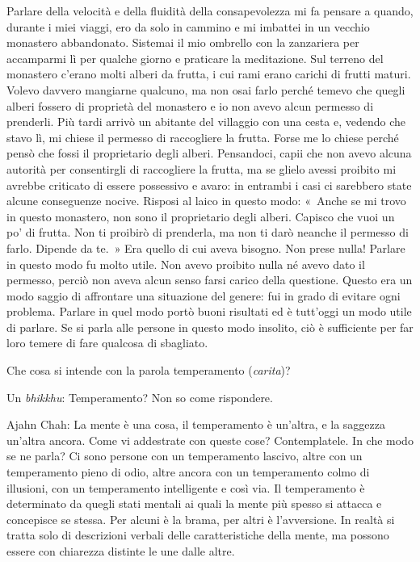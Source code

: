Parlare della velocità e della fluidità della consapevolezza mi fa
pensare a quando, durante i miei viaggi, ero da solo in cammino e mi
imbattei in un vecchio monastero abbandonato. Sistemai il mio ombrello
con la zanzariera per accamparmi lì per qualche giorno e praticare la
meditazione. Sul terreno del monastero c'erano molti alberi da frutta, i
cui rami erano carichi di frutti maturi. Volevo davvero mangiarne
qualcuno, ma non osai farlo perché temevo che quegli alberi fossero di
proprietà del monastero e io non avevo alcun permesso di prenderli. Più
tardi arrivò un abitante del villaggio con una cesta e, vedendo che
stavo lì, mi chiese il permesso di raccogliere la frutta. Forse me lo
chiese perché pensò che fossi il proprietario degli alberi. Pensandoci,
capii che non avevo alcuna autorità per consentirgli di raccogliere la
frutta, ma se glielo avessi proibito mi avrebbe criticato di essere
possessivo e avaro: in entrambi i casi ci sarebbero state alcune
conseguenze nocive. Risposi al laico in questo modo: «~Anche se mi trovo
in questo monastero, non sono il proprietario degli alberi. Capisco che
vuoi un po' di frutta. Non ti proibirò di prenderla, ma non ti darò
neanche il permesso di farlo. Dipende da te.~» Era quello di cui aveva
bisogno. Non prese nulla! Parlare in questo modo fu molto utile. Non
avevo proibito nulla né avevo dato il permesso, perciò non aveva alcun
senso farsi carico della questione. Questo era un modo saggio di
affrontare una situazione del genere: fui in grado di evitare ogni
problema. Parlare in quel modo portò buoni risultati ed è tutt'oggi un
modo utile di parlare. Se si parla alle persone in questo modo insolito,
ciò è sufficiente per far loro temere di fare qualcosa di sbagliato.

Che cosa si intende con la parola temperamento (\emph{carita})?

Un \emph{bhikkhu}: Temperamento? Non so come rispondere.

Ajahn Chah: La mente è una cosa, il temperamento è un'altra, e la
saggezza un'altra ancora. Come vi addestrate con queste cose?
Contemplatele. In che modo se ne parla? Ci sono persone con un
temperamento lascivo, altre con un temperamento pieno di odio, altre
ancora con un temperamento colmo di illusioni, con un temperamento
intelligente e così via. Il temperamento è determinato da quegli stati
mentali ai quali la mente più spesso si attacca e concepisce se stessa.
Per alcuni è la brama, per altri è l'avversione. In realtà si tratta
solo di descrizioni verbali delle caratteristiche della mente, ma
possono essere con chiarezza distinte le une dalle altre.

